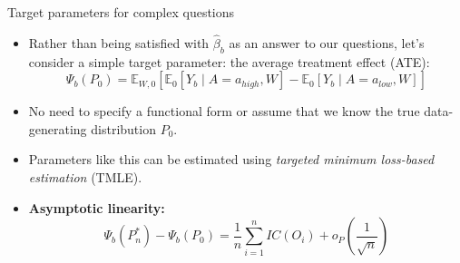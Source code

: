 \documentclass[12pt,t]{beamer}
\begin{document}
\begin{frame}[c]{Target parameters for complex questions}

\begin{center}
\begin{itemize}
  \itemsep12pt
  \item Rather than being satisfied with $\hat{\beta}_{b}$ as an answer to our
    questions, let's consider a simple target parameter: the average treatment
    effect (ATE):
    \[
      \Psi_b(P_0) = \mathbb{E}_{W,0}[\mathbb{E}_0[Y_b \mid A = a_{high}, W] -
      \mathbb{E}_0[Y_b \mid A = a_{low}, W]]
    \]
  \item No need to specify a functional form or assume that we know the true
    data-generating distribution $P_0$.
  \item Parameters like this can be estimated using \textit{targeted minimum
    loss-based estimation} (TMLE).
  \item \textbf{Asymptotic linearity:}
    \[
      \Psi_b(P_n^*) - \Psi_b(P_0) = \frac{1}{n} \sum_{i = 1}^{n} IC(O_i) +
      o_P(\frac{1}{\sqrt{n}})
    \]
\end{itemize}
\end{center}

\end{frame}

\end{document}
